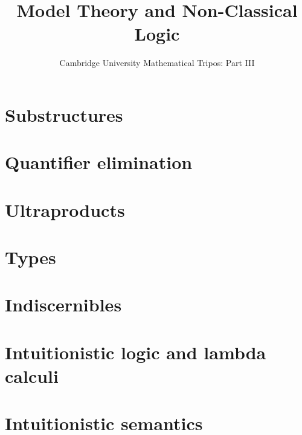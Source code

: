 \documentclass{article}
\title{Model Theory and Non-Classical Logic}
\author{Cambridge University Mathematical Tripos: Part III}
\begin{document}
\maketitle

\tableofcontentsnewpage{}

\section{Substructures}

\section{Quantifier elimination}

\section{Ultraproducts}

\section{Types}

\section{Indiscernibles}

\section{Intuitionistic logic and lambda calculi}

\section{Intuitionistic semantics}

\end{document}
